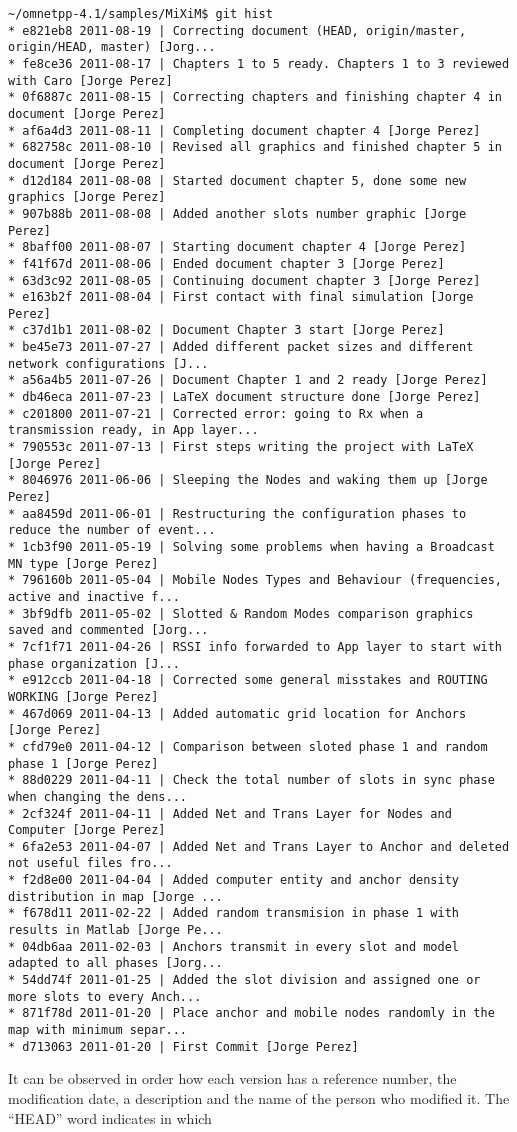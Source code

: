 \footnotesize{
\begin{verbatim}
~/omnetpp-4.1/samples/MiXiM$ git hist
* e821eb8 2011-08-19 | Correcting document (HEAD, origin/master, origin/HEAD, master) [Jorg...
* fe8ce36 2011-08-17 | Chapters 1 to 5 ready. Chapters 1 to 3 reviewed with Caro [Jorge Perez]
* 0f6887c 2011-08-15 | Correcting chapters and finishing chapter 4 in document [Jorge Perez]
* af6a4d3 2011-08-11 | Completing document chapter 4 [Jorge Perez]
* 682758c 2011-08-10 | Revised all graphics and finished chapter 5 in document [Jorge Perez]
* d12d184 2011-08-08 | Started document chapter 5, done some new graphics [Jorge Perez]
* 907b88b 2011-08-08 | Added another slots number graphic [Jorge Perez]
* 8baff00 2011-08-07 | Starting document chapter 4 [Jorge Perez]
* f41f67d 2011-08-06 | Ended document chapter 3 [Jorge Perez]
* 63d3c92 2011-08-05 | Continuing document chapter 3 [Jorge Perez]
* e163b2f 2011-08-04 | First contact with final simulation [Jorge Perez]
* c37d1b1 2011-08-02 | Document Chapter 3 start [Jorge Perez]
* be45e73 2011-07-27 | Added different packet sizes and different network configurations [J...
* a56a4b5 2011-07-26 | Document Chapter 1 and 2 ready [Jorge Perez]
* db46eca 2011-07-23 | LaTeX document structure done [Jorge Perez]
* c201800 2011-07-21 | Corrected error: going to Rx when a transmission ready, in App layer...
* 790553c 2011-07-13 | First steps writing the project with LaTeX [Jorge Perez]
* 8046976 2011-06-06 | Sleeping the Nodes and waking them up [Jorge Perez]
* aa8459d 2011-06-01 | Restructuring the configuration phases to reduce the number of event...
* 1cb3f90 2011-05-19 | Solving some problems when having a Broadcast MN type [Jorge Perez]
* 796160b 2011-05-04 | Mobile Nodes Types and Behaviour (frequencies, active and inactive f...
* 3bf9dfb 2011-05-02 | Slotted & Random Modes comparison graphics saved and commented [Jorg...
* 7cf1f71 2011-04-26 | RSSI info forwarded to App layer to start with phase organization [J...
* e912ccb 2011-04-18 | Corrected some general misstakes and ROUTING WORKING [Jorge Perez]
* 467d069 2011-04-13 | Added automatic grid location for Anchors [Jorge Perez]
* cfd79e0 2011-04-12 | Comparison between sloted phase 1 and random phase 1 [Jorge Perez]
* 88d0229 2011-04-11 | Check the total number of slots in sync phase when changing the dens...
* 2cf324f 2011-04-11 | Added Net and Trans Layer for Nodes and Computer [Jorge Perez]
* 6fa2e53 2011-04-07 | Added Net and Trans Layer to Anchor and deleted not useful files fro...
* f2d8e00 2011-04-04 | Added computer entity and anchor density distribution in map [Jorge ...
* f678d11 2011-02-22 | Added random transmision in phase 1 with results in Matlab [Jorge Pe...
* 04db6aa 2011-02-03 | Anchors transmit in every slot and model adapted to all phases [Jorg...
* 54dd74f 2011-01-25 | Added the slot division and assigned one or more slots to every Anch...
* 871f78d 2011-01-20 | Place anchor and mobile nodes randomly in the map with minimum separ...
* d713063 2011-01-20 | First Commit [Jorge Perez]
\end{verbatim}
}

It can be observed in order how each version has a reference number, the modification date, a description and the name of the person who modified
it. The ``HEAD'' word indicates in which 

